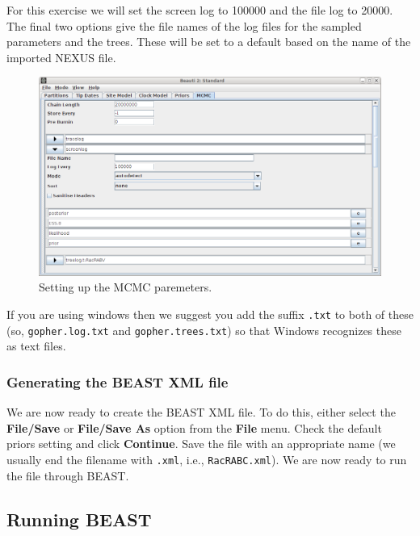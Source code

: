 \documentclass{article}
\begin{document}
For this exercise we will set the screen log to 100000 and the file log to 20000. The final two
options give the file names of the log files for the sampled parameters and
the trees. These will be set to a default based on the name of the
imported NEXUS file. 

\begin{figure}
\begin{center}

\includegraphics[scale=0.4]{figures/BEAUti_MCMC}

\end{center}
\caption{\label{fig.MCMC} Setting up the MCMC paremeters.}
\end{figure}


If you are using windows then we suggest you add the suffix \texttt{.txt} to both of these (so,
\texttt{gopher.log.txt} and \texttt{gopher.trees.txt}) so that Windows recognizes
these as text files. 

\subsubsection*{Generating the BEAST XML file }

We are now ready to create the BEAST XML file. To do this, either select the {\bf File/Save} or {\bf File/Save As} option from the \textbf{File} menu. Check the default priors setting and click \textbf{Continue}. Save the file with an appropriate name (we usually end the filename with \texttt{.xml}, i.e., \texttt{RacRABC.xml}). We are now ready to run the file through BEAST. 

\subsection*{Running BEAST }
\end{document}

